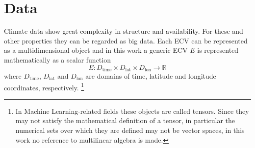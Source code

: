 \section{Data}
Climate data show great complexity in structure and availability. For these and other properties they can be regarded as big data.\cite{2014FaghmousABig}
Each \gls{ECV} can be represented as a multidimensional object and in this work a generic \gls{ECV} $E$ is represented mathematically as a scalar function
\begin{equation}
  E : D_\text{time} \times D_\text{lat} \times D_\text{lon} \to \mathbb{R}
\end{equation}
where $D_\text{time}$, $D_\text{lat}$ and $D_\text{lon}$ are domains of time, latitude and longitude coordinates, respectively.%
\footnote{In Machine Learning-related fields these objects are called tensors. Since they may not satisfy the mathematical definition of a tensor, in particular the numerical sets over which they are defined may not be vector spaces, in this work no reference to multilinear algebra is made.}
